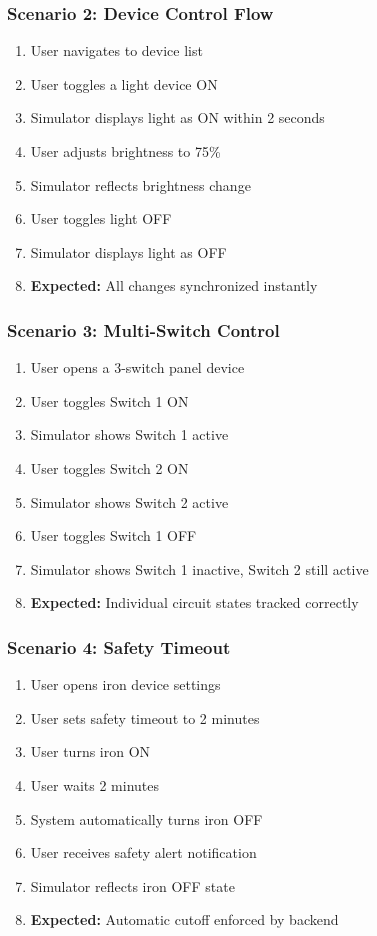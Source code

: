 \documentclass[12pt,a4paper]{article}
\begin{document}
\subsubsection{Scenario 2: Device Control Flow}
\begin{enumerate}
    \item User navigates to device list
    \item User toggles a light device ON
    \item Simulator displays light as ON within 2 seconds
    \item User adjusts brightness to 75\%
    \item Simulator reflects brightness change
    \item User toggles light OFF
    \item Simulator displays light as OFF
    \item \textbf{Expected:} All changes synchronized instantly
\end{enumerate}

\subsubsection{Scenario 3: Multi-Switch Control}
\begin{enumerate}
    \item User opens a 3-switch panel device
    \item User toggles Switch 1 ON
    \item Simulator shows Switch 1 active
    \item User toggles Switch 2 ON
    \item Simulator shows Switch 2 active
    \item User toggles Switch 1 OFF
    \item Simulator shows Switch 1 inactive, Switch 2 still active
    \item \textbf{Expected:} Individual circuit states tracked correctly
\end{enumerate}

\subsubsection{Scenario 4: Safety Timeout}
\begin{enumerate}
    \item User opens iron device settings
    \item User sets safety timeout to 2 minutes
    \item User turns iron ON
    \item User waits 2 minutes
    \item System automatically turns iron OFF
    \item User receives safety alert notification
    \item Simulator reflects iron OFF state
    \item \textbf{Expected:} Automatic cutoff enforced by backend
\end{enumerate}
\end{document}
